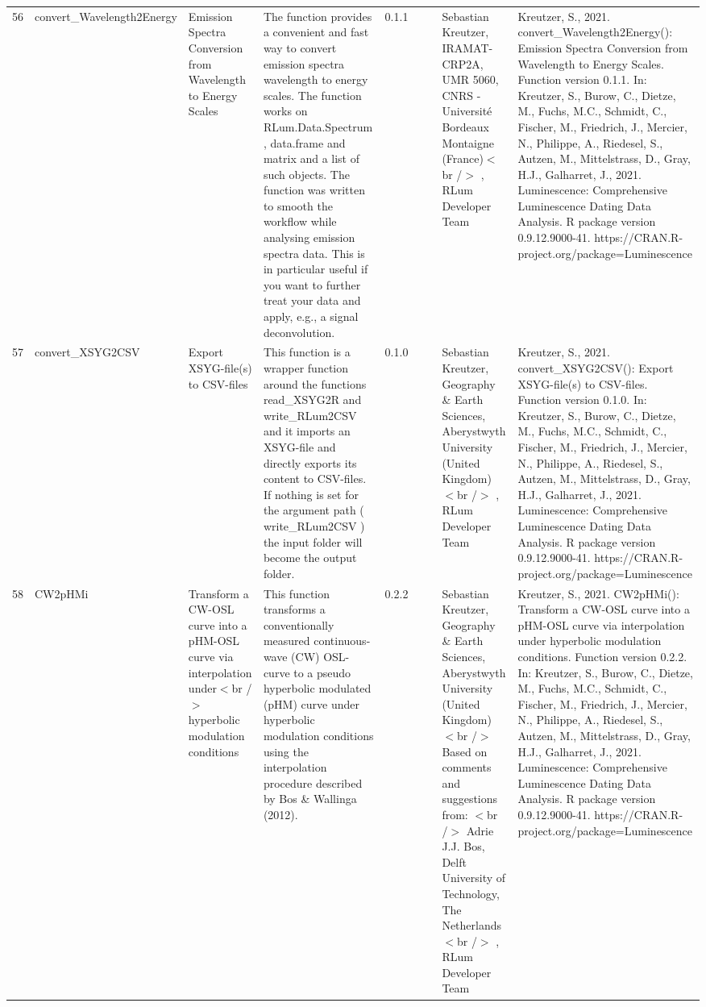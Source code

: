 \begin{table}[ht]
\begin{tabular}{rllllllll}
 \\ 
  56 & convert\_Wavelength2Energy & Emission Spectra Conversion from Wavelength to Energy Scales & The function provides a convenient and fast way to convert emission spectra wavelength to energy scales. The function works on  RLum.Data.Spectrum ,  data.frame  and  matrix  and a  list  of such objects. The function was written to smooth the workflow while analysing emission spectra data. This is in particular useful if you want to further treat your data and apply, e.g., a signal deconvolution. & 0.1.1
 &  &  & Sebastian Kreutzer, IRAMAT-CRP2A, UMR 5060, CNRS - Université Bordeaux Montaigne (France)$<$br /$>$ , RLum Developer Team & Kreutzer, S., 2021. convert\_Wavelength2Energy(): Emission Spectra Conversion from Wavelength to Energy Scales. Function version 0.1.1. In: Kreutzer, S., Burow, C., Dietze, M., Fuchs, M.C., Schmidt, C., Fischer, M., Friedrich, J., Mercier, N., Philippe, A., Riedesel, S., Autzen, M., Mittelstrass, D., Gray, H.J., Galharret, J., 2021. Luminescence: Comprehensive Luminescence Dating Data Analysis. R package version 0.9.12.9000-41. https://CRAN.R-project.org/package=Luminescence
 \\ 
  57 & convert\_XSYG2CSV & Export XSYG-file(s) to CSV-files & This function is a wrapper function around the functions  read\_XSYG2R  and write\_RLum2CSV  and it imports an XSYG-file and directly exports its content to CSV-files. If nothing is set for the argument  path  ( write\_RLum2CSV ) the input folder will become the output folder. & 0.1.0
 &  &  & Sebastian Kreutzer, Geography \& Earth Sciences, Aberystwyth University (United Kingdom)$<$br /$>$ , RLum Developer Team & Kreutzer, S., 2021. convert\_XSYG2CSV(): Export XSYG-file(s) to CSV-files. Function version 0.1.0. In: Kreutzer, S., Burow, C., Dietze, M., Fuchs, M.C., Schmidt, C., Fischer, M., Friedrich, J., Mercier, N., Philippe, A., Riedesel, S., Autzen, M., Mittelstrass, D., Gray, H.J., Galharret, J., 2021. Luminescence: Comprehensive Luminescence Dating Data Analysis. R package version 0.9.12.9000-41. https://CRAN.R-project.org/package=Luminescence
 \\ 
  58 & CW2pHMi & Transform a CW-OSL curve into a pHM-OSL curve via interpolation under$<$br /$>$ hyperbolic modulation conditions & This function transforms a conventionally measured continuous-wave (CW) OSL-curve to a pseudo hyperbolic modulated (pHM) curve under hyperbolic modulation conditions using the interpolation procedure described by Bos \& Wallinga (2012). & 0.2.2
 &  &  & Sebastian Kreutzer, Geography \& Earth Sciences, Aberystwyth University (United Kingdom) $<$br /$>$ Based on comments and suggestions from: $<$br /$>$ Adrie J.J. Bos, Delft University of Technology, The Netherlands$<$br /$>$ , RLum Developer Team & Kreutzer, S., 2021. CW2pHMi(): Transform a CW-OSL curve into a pHM-OSL curve via interpolation under hyperbolic modulation conditions. Function version 0.2.2. In: Kreutzer, S., Burow, C., Dietze, M., Fuchs, M.C., Schmidt, C., Fischer, M., Friedrich, J., Mercier, N., Philippe, A., Riedesel, S., Autzen, M., Mittelstrass, D., Gray, H.J., Galharret, J., 2021. Luminescence: Comprehensive Luminescence Dating Data Analysis. R package version 0.9.12.9000-41. https://CRAN.R-project.org/package=Luminescence

\end{tabular}
\end{table}
